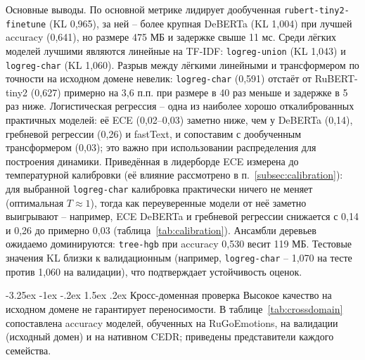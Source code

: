 \documentclass[12pt,a4paper]{report}
\makeatletter
\renewcommand{\subsection}{\@startsection{subsection}{2}{\z@}%
  {-3.25ex \@plus -1ex \@minus -.2ex}%
  {1.5ex \@plus .2ex}%
  {\normalfont\large\bfseries\centering}}
\makeatother
\begin{document}
Основные выводы. По основной метрике лидирует дообученная \texttt{rubert-tiny2-finetune} (KL 0{,}965), за ней -- более крупная DeBERTa (KL 1{,}004) при лучшей accuracy (0{,}641), но размере 475 МБ и задержке свыше 11 мс. Среди лёгких моделей лучшими являются линейные на TF-IDF: \texttt{logreg-union} (KL 1{,}043) и \texttt{logreg-char} (KL 1{,}060). Разрыв между лёгкими линейными и трансформером по точности на исходном домене невелик: \texttt{logreg-char} (0{,}591) отстаёт от RuBERT-tiny2 (0{,}627) примерно на 3{,}6 п.п. при размере в 40 раз меньше и задержке в 5 раз ниже. Логистическая регрессия -- одна из наиболее хорошо откалиброванных практичных моделей: её ECE (0{,}02--0{,}03) заметно ниже, чем у DeBERTa (0{,}14), гребневой регрессии (0{,}26) и fastText, и сопоставим с дообученным трансформером (0{,}03); это важно при использовании распределения для построения динамики. Приведённая в лидерборде ECE измерена до температурной калибровки (её влияние рассмотрено в п.~\ref{subsec:calibration}): для выбранной \texttt{logreg-char} калибровка практически ничего не меняет (оптимальная \(T\approx1\)), тогда как переуверенные модели от неё заметно выигрывают -- например, ECE DeBERTa и гребневой регрессии снижается с 0{,}14 и 0{,}26 до примерно 0{,}03 (таблица~\ref{tab:calibration}). Ансамбли деревьев ожидаемо доминируются: \texttt{tree-hgb} при accuracy 0{,}530 весит 119 МБ. Тестовые значения KL близки к валидационным (например, \texttt{logreg-char} -- 1{,}070 на тесте против 1{,}060 на валидации), что подтверждает устойчивость оценок.

\subsection{Кросс-доменная проверка}
Высокое качество на исходном домене не гарантирует переносимости. В таблице~\ref{tab:crossdomain} сопоставлена accuracy моделей, обученных на RuGoEmotions, на валидации (исходный домен) и на нативном CEDR; приведены представители каждого семейства.
\end{document}
